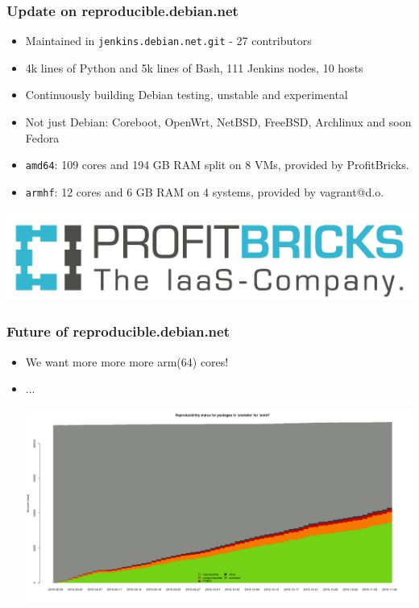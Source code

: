 \documentclass[14pt]{beamer}
\begin{document}
\begin{frame}
 \frametitle{Update on reproducible.debian.net}

 \begin{itemize}
  \item Maintained in \texttt{jenkins.debian.net.git} - 27 contributors
  \item \small{4k lines of Python and 5k lines of Bash, 111 Jenkins nodes, 10 hosts}
  \item Continuously building Debian testing, unstable and experimental
  \item Not just Debian: Coreboot, OpenWrt, NetBSD, FreeBSD,
  Archlinux and soon Fedora
  \item \texttt{amd64}: 109 cores and 194 GB RAM split on 8 VMs, provided by ProfitBricks.
  \item \texttt{armhf}: 12 cores and 6 GB RAM on 4 systems, provided by
  vagrant@d.o.
 \end{itemize}
 \vfill
 \begin{center}
 \includegraphics[height=0.15\paperheight]{images/profitbricks_logo.png}
 \end{center}
\end{frame}

\begin{frame}
 \frametitle{Future of reproducible.debian.net}

 \begin{itemize}
 \item We want more more more arm(64) cores!
 \item ...
 \begin{center}
  \includegraphics[height=0.5\paperheight]{images/stats_pkg_state_armhf.png}
  \vfill
 \end{center}
 \end{itemize}
\end{frame}
\end{document}
